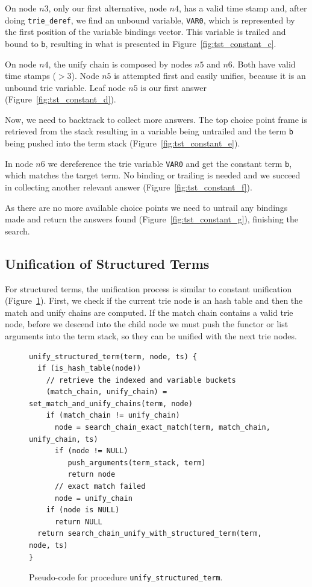 On node $n3$, only our first alternative, node $n4$, has a valid time stamp and, after doing
\texttt{trie\_deref}, we find an unbound variable, \texttt{VAR0}, which is represented
by the first position of the variable bindings vector.
This variable is trailed and bound to \texttt{b},
resulting in what is presented in Figure~\ref{fig:tst_constant_c}.

On node $n4$, the unify chain is composed by nodes $n5$ and $n6$. Both have valid time stamps ($> 3$).
Node $n5$ is attempted first and easily unifies, because it is an unbound trie variable.
Leaf node $n5$ is our first answer (Figure~\ref{fig:tst_constant_d}).

Now, we need to backtrack to collect more answers. The top choice point frame is retrieved from the
stack resulting in a variable being untrailed and the term \texttt{b} being pushed into the term
stack (Figure~\ref{fig:tst_constant_e}).

In node $n6$ we dereference the trie variable \texttt{VAR0} and get the constant term \texttt{b},
which matches the target term. No binding or trailing is needed and we succeed in collecting another
relevant answer (Figure~\ref{fig:tst_constant_f}).

As there are no more available choice points we need to untrail any bindings made and return
the answers found (Figure~\ref{fig:tst_constant_g}), finishing the search.

\subsection{Unification of Structured Terms}

For structured terms, the unification process is similar to constant unification
(Figure~\ref{fig:unify_structured_term}). First, we check if the current trie node is an
hash table and then the match and unify chains are computed. If the match chain contains
a valid trie node, before we descend into the child node we must push the functor or list
arguments into the term stack, so they can be unified with the next trie nodes.

\begin{figure}[h]
\begin{Verbatim}
unify_structured_term(term, node, ts) {
  if (is_hash_table(node))
    // retrieve the indexed and variable buckets
    (match_chain, unify_chain) = set_match_and_unify_chains(term, node)
    if (match_chain != unify_chain)
      node = search_chain_exact_match(term, match_chain, unify_chain, ts)
      if (node != NULL)
         push_arguments(term_stack, term)
         return node
      // exact match failed
      node = unify_chain
    if (node is NULL)
      return NULL
  return search_chain_unify_with_structured_term(term, node, ts)
}
\end{Verbatim}
\caption{Pseudo-code for procedure \texttt{unify\_structured\_term}.}
\label{fig:unify_structured_term}
\end{figure}

